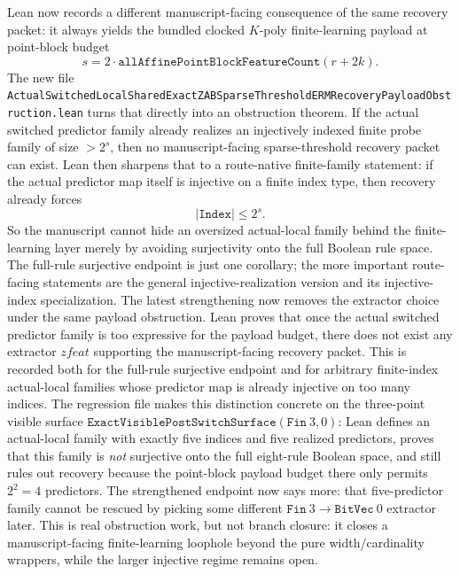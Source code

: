 \documentclass[11pt]{article}
\theoremstyle{remark}
\begin{document}
Lean now records a different manuscript-facing consequence of the same recovery
packet: it always yields the bundled clocked \(K\)-poly finite-learning payload
at point-block budget
\[
  s = 2 \cdot \texttt{allAffinePointBlockFeatureCount}(r+2k).
\]
The new file
\texttt{ActualSwitchedLocalSharedExactZABSparseThresholdERMRecoveryPayloadObstruction.lean}
turns that directly into an obstruction theorem.  If the actual switched
predictor family already realizes an injectively indexed finite probe family of
size \(> 2^s\), then no manuscript-facing sparse-threshold recovery packet can
exist.  Lean then sharpens that to a route-native finite-family statement: if
the actual predictor map itself is injective on a finite index type, then
recovery already forces
\[
  |\texttt{Index}| \le 2^s.
\]
So the manuscript cannot hide an oversized actual-local family behind the
finite-learning layer merely by avoiding surjectivity onto the full Boolean
rule space.  The full-rule surjective endpoint is just one corollary; the more
important route-facing statements are the general injective-realization version
and its injective-index specialization.  The latest strengthening now removes
the extractor choice under the same payload obstruction.  Lean proves that once
the actual switched predictor family is too expressive for the payload budget,
there does not exist any extractor \(zfeat\) supporting the manuscript-facing
recovery packet.  This is recorded both for the full-rule surjective endpoint
and for arbitrary finite-index actual-local families whose predictor map is
already injective on too many indices.  The regression file makes this
distinction concrete on the three-point visible surface
\(\texttt{ExactVisiblePostSwitchSurface}(\texttt{Fin}\ 3,0)\): Lean defines an
actual-local family with exactly five indices and five realized predictors,
proves that this family is \emph{not} surjective onto the full eight-rule
Boolean space, and still rules out recovery because the point-block payload
budget there only permits \(2^2 = 4\) predictors.  The strengthened endpoint
now says more: that five-predictor family cannot be rescued by picking some
different \(\texttt{Fin}\ 3 \to \texttt{BitVec}\ 0\) extractor later.  This is
real obstruction work, but not branch closure: it closes a manuscript-facing
finite-learning loophole beyond the pure width/cardinality wrappers, while the
larger injective regime remains open.
\end{document}
